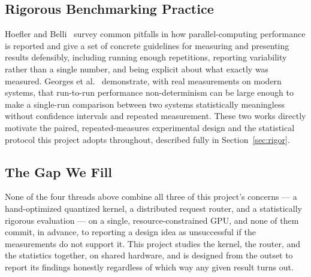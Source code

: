\documentclass[11pt,a4paper]{article}
\begin{document}
\subsection{Rigorous Benchmarking Practice}
Hoefler and Belli~\cite{hoefler} survey common pitfalls in how parallel-computing performance is reported and give a
set of concrete guidelines for measuring and presenting results defensibly, including running enough repetitions,
reporting variability rather than a single number, and being explicit about what exactly was measured. Georges et
al.~\cite{georges} demonstrate, with real measurements on modern systems, that run-to-run performance
non-determinism can be large enough to make a single-run comparison between two systems statistically meaningless
without confidence intervals and repeated measurement. These two works directly motivate the paired,
repeated-measures experimental design and the statistical protocol this project adopts throughout, described fully
in Section~\ref{sec:rigor}.

\subsection{The Gap We Fill}
None of the four threads above combine all three of this project's concerns --- a hand-optimized quantized kernel, a
distributed request router, and a statistically rigorous evaluation --- on a single, resource-constrained GPU, and
none of them commit, in advance, to reporting a design idea as unsuccessful if the measurements do not support it.
This project studies the kernel, the router, and the statistics together, on shared hardware, and is designed from
the outset to report its findings honestly regardless of which way any given result turns out.
\end{document}
